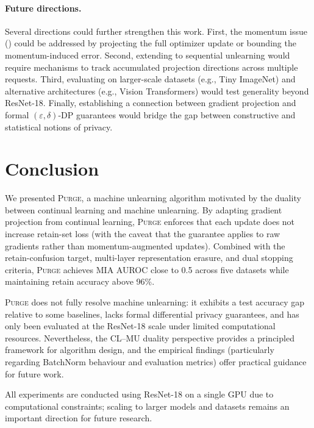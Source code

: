 \documentclass[10pt,twocolumn]{article}
\newcommand{\ours}{\textsc{Purge}}
\begin{document}
\paragraph{Future directions.}
Several directions could further strengthen this work.
First, the momentum issue () could be addressed by projecting the full optimizer update or bounding the momentum-induced error.
Second, extending to sequential unlearning would require mechanisms to track accumulated projection directions across multiple requests.
Third, evaluating on larger-scale datasets (e.g., Tiny ImageNet) and alternative architectures (e.g., Vision Transformers) would test generality beyond ResNet-18.
Finally, establishing a connection between gradient projection and formal $(\varepsilon, \delta)$-DP guarantees would bridge the gap between constructive and statistical notions of privacy.

\section{Conclusion}\label{sec:conclusion}

We presented \ours{}, a machine unlearning algorithm motivated by the duality between continual learning and machine unlearning.
By adapting gradient projection from continual learning, \ours{} enforces that each update does not increase retain-set loss (with the caveat that the guarantee applies to raw gradients rather than momentum-augmented updates).
Combined with the retain-confusion target, multi-layer representation erasure, and dual stopping criteria, \ours{} achieves MIA AUROC close to 0.5 across five datasets while maintaining retain accuracy above 96\%.

\ours{} does not fully resolve machine unlearning: it exhibits a test accuracy gap relative to some baselines, lacks formal differential privacy guarantees, and has only been evaluated at the ResNet-18 scale under limited computational resources.
Nevertheless, the CL--MU duality perspective provides a principled framework for algorithm design, and the empirical findings (particularly regarding BatchNorm behaviour and evaluation metrics) offer practical guidance for future work.

All experiments are conducted using ResNet-18 on a single GPU due to computational constraints; scaling to larger models and datasets remains an important direction for future research.


\end{document}
